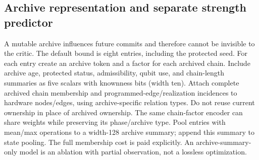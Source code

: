 \documentclass[11pt,a4paper]{article}
\theoremstyle{definition}\newtheorem{definition}[proposition]{Definition}
\begin{document}
\subsection{Archive representation and separate strength predictor}

A mutable archive influences future commits and therefore cannot be invisible to the critic. The default bound is eight entries, including the protected seed. For each entry create an archive token and a factor for each archived chain. Include archive age, protected status, admissibility, qubit use, and chain-length summaries as five scalars with knownness bits (width ten). Attach complete archived chain membership and programmed-edge/realization incidences to hardware nodes/edges, using archive-specific relation types. Do not reuse current ownership in place of archived ownership. The same chain-factor encoder can share weights while preserving its phase/archive type. Pool entries with mean/max operations to a width-128 archive summary; append this summary to state pooling. The full membership cost is paid explicitly. An archive-summary-only model is an ablation with partial observation, not a lossless optimization.
\end{document}
